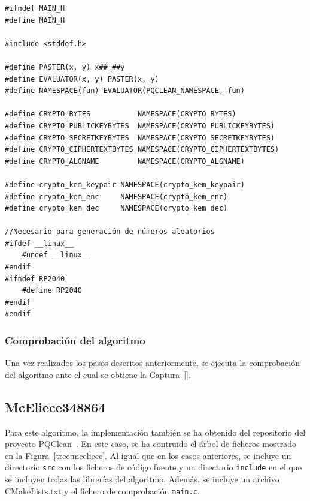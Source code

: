\begin{lstlisting}[label={lst:hqc-mainh},style=Cnice,firstnumber=1,caption={Archivo \texttt{HQC-128/main.h}.}]
#ifndef MAIN_H
#define MAIN_H

#include <stddef.h>

#define PASTER(x, y) x##_##y
#define EVALUATOR(x, y) PASTER(x, y)
#define NAMESPACE(fun) EVALUATOR(PQCLEAN_NAMESPACE, fun)

#define CRYPTO_BYTES           NAMESPACE(CRYPTO_BYTES)
#define CRYPTO_PUBLICKEYBYTES  NAMESPACE(CRYPTO_PUBLICKEYBYTES)
#define CRYPTO_SECRETKEYBYTES  NAMESPACE(CRYPTO_SECRETKEYBYTES)
#define CRYPTO_CIPHERTEXTBYTES NAMESPACE(CRYPTO_CIPHERTEXTBYTES)
#define CRYPTO_ALGNAME         NAMESPACE(CRYPTO_ALGNAME)

#define crypto_kem_keypair NAMESPACE(crypto_kem_keypair)
#define crypto_kem_enc     NAMESPACE(crypto_kem_enc)
#define crypto_kem_dec     NAMESPACE(crypto_kem_dec)

//Necesario para generación de números aleatorios
#ifdef __linux__
    #undef __linux__
#endif
#ifndef RP2040
    #define RP2040
#endif
#endif
\end{lstlisting}


\subsubsection{Comprobación del algoritmo}\label{subsubsec:hqc-comp}

Una vez realizados los pasos descritos anteriormente, se ejecuta la comprobación del algoritmo ante el cual se obtiene la Captura~\ref{}.



\subsection{McEliece348864}\label{subsec:mceliece}

Para este algoritmo, la implementación también se ha obtenido del repositorio del proyecto PQClean~\cite{pqclean-github}.
En este caso, se ha contruido el árbol de ficheros mostrado en la Figura~\ref{tree:mceliece}.
Al igual que en los casos anteriores, se incluye un directorio \texttt{src} con los ficheros de código fuente y un directorio \texttt{include} en el que se incluyen todas las librerías del algoritmo.
Además, se incluye un archivo CMakeLists.txt y el fichero de comprobación \texttt{main.c}.

